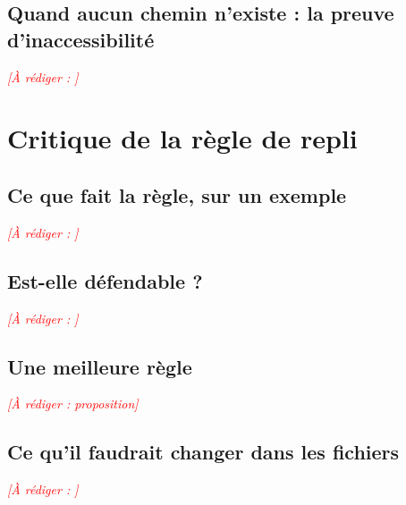 \documentclass[11pt,a4paper]{article}
\newcommand{\afaire}[1]{\textcolor{red}{\textit{[À rédiger : #1]}}}
\begin{document}
\subsection{Quand aucun chemin n'existe : la preuve d'inaccessibilité}
\afaire{}

\section{Critique de la règle de repli}

\subsection{Ce que fait la règle, sur un exemple}
\afaire{}

\subsection{Est-elle défendable ?}
\afaire{}

\subsection{Une meilleure règle}
\afaire{proposition}

\subsection{Ce qu'il faudrait changer dans les fichiers}
\afaire{}
\end{document}
